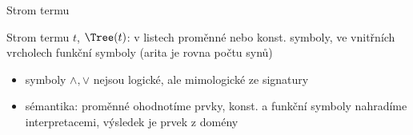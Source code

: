 \documentclass{beamer}
\begin{document}
\begin{frame}{Strom termu}
    
    \vspace{-3pt}
    \alert{Strom termu} $t$, \alert{$\Tree(t)$}: v listech proměnné nebo konst. symboly, ve vnitřních vrcholech funkční symboly (arita je rovna počtu synů) \pause 

    \begin{center}

    \end{center} \pause 

    \begin{itemize}
        \item symboly $\land,\lor$ nejsou logické, ale mimologické ze signatury \pause 
        \item \alert{sémantika}: proměnné ohodnotíme prvky, konst. a funkční symboly nahradíme interpretacemi, výsledek je prvek z domény
    \end{itemize}
    
\end{frame}
\end{document}
